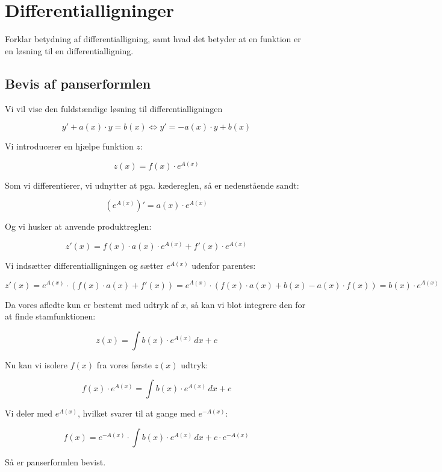 
\section{Differentialligninger}

Forklar betydning af differentialligning, samt hvad det betyder at en funktion er en løsning til en differentialligning.

\subsection{Bevis af panserformlen}

\begin{proofw}
    
Vi vil vise den fuldstændige løsning til differentialligningen

$$
    y'+a(x)\cdot y=b(x) \Leftrightarrow y'=-a(x) \cdot y + b(x) 
$$

Vi introducerer en hjælpe funktion $z$:

$$
    z(x)=f(x) \cdot e^{A(x)}
$$

Som vi differentierer, vi udnytter at pga. kædereglen,
så er nedenstående sandt:

$$
    \left(e^{A(x)}\right)'=a(x) \cdot e^{A(x)}
$$

Og vi husker at anvende produktreglen:

$$
    z'(x)=f(x) \cdot a(x) \cdot e^{A(x)}+f'(x)\cdot e^{A(x)}
$$

Vi indsætter differentialligningen og sætter $e^{A(x)}$ udenfor parentes:

$$
    z'(x)= e^{A(x)} \cdot (f(x) \cdot a(x) +f'(x))=
    e^{A(x)} \cdot (f(x) \cdot a(x) +b(x)-a(x)\cdot f(x))
    = b(x) \cdot e^{A(x)}
$$

Da vores afledte kun er bestemt med udtryk af $x$,
så kan vi blot integrere den for at finde stamfunktionen:

$$z(x)= \int b(x) \cdot e^{A(x)} \,dx+c$$

Nu kan vi isolere $f(x)$ fra vores første $z(x)$ udtryk:

$$
    f(x) \cdot e^{A(x)}=\int b(x) \cdot e^{A(x)} \,dx+c
$$

Vi deler med $e^{A(x)}$, hvilket svarer til at gange med $e^{-A(x)}$:

$$
    f(x)=e^{-A(x)} \cdot \int b(x) \cdot e^{A(x)} \,dx+c \cdot e^{-A(x)}
$$

Så er panserformlen bevist.

\end{proofw}
